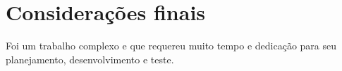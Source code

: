 \documentclass[article,12pt,oneside,a4paper,english,brazil,sumario=tradicional]{abntex2}
\begin{document}
\section{Considera\c c\~oes finais}
Foi um trabalho complexo e que requereu muito tempo e dedicação para seu planejamento, desenvolvimento e teste.

\renewcommand{\bibsection}{\section*{REFER\^ENCIAS BIBLIOGR\'AFICAS}}


\end{document}
